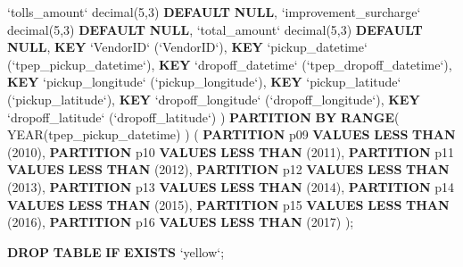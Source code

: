 \documentclass[12pt,twoside]{reedthesis}
\newenvironment{Shaded}{\begin{snugshade}}{\end{snugshade}}
\newcommand{\KeywordTok}[1]{\textcolor[rgb]{0.13,0.29,0.53}{\textbf{#1}}}
\newcommand{\DataTypeTok}[1]{\textcolor[rgb]{0.13,0.29,0.53}{#1}}
\newcommand{\DecValTok}[1]{\textcolor[rgb]{0.00,0.00,0.81}{#1}}
\newcommand{\NormalTok}[1]{#1}
\theoremstyle{definition}
\theoremstyle{definition}
\theoremstyle{definition}
\theoremstyle{remark}
\begin{document}
\begin{Shaded}
\begin{Highlighting}[]
\NormalTok{ `tolls_amount` }\DataTypeTok{decimal}\NormalTok{(}\DecValTok{5}\NormalTok{,}\DecValTok{3}\NormalTok{) }\KeywordTok{DEFAULT} \KeywordTok{NULL}\NormalTok{,}
\NormalTok{ `improvement_surcharge` }\DataTypeTok{decimal}\NormalTok{(}\DecValTok{5}\NormalTok{,}\DecValTok{3}\NormalTok{) }\KeywordTok{DEFAULT} \KeywordTok{NULL}\NormalTok{,}
\NormalTok{ `total_amount` }\DataTypeTok{decimal}\NormalTok{(}\DecValTok{5}\NormalTok{,}\DecValTok{3}\NormalTok{) }\KeywordTok{DEFAULT} \KeywordTok{NULL}\NormalTok{,}
 \KeywordTok{KEY}\NormalTok{ `VendorID` (`VendorID`),}
 \KeywordTok{KEY}\NormalTok{ `pickup_datetime` (`tpep_pickup_datetime`),}
 \KeywordTok{KEY}\NormalTok{ `dropoff_datetime` (`tpep_dropoff_datetime`),}
 \KeywordTok{KEY}\NormalTok{ `pickup_longitude` (`pickup_longitude`),}
 \KeywordTok{KEY}\NormalTok{ `pickup_latitude` (`pickup_latitude`),}
 \KeywordTok{KEY}\NormalTok{ `dropoff_longitude` (`dropoff_longitude`),}
 \KeywordTok{KEY}\NormalTok{ `dropoff_latitude` (`dropoff_latitude`)}
\NormalTok{)}
\KeywordTok{PARTITION} \KeywordTok{BY} \KeywordTok{RANGE}\NormalTok{( }\DataTypeTok{YEAR}\NormalTok{(tpep_pickup_datetime) ) (}
  \KeywordTok{PARTITION}\NormalTok{ p09 }\KeywordTok{VALUES} \KeywordTok{LESS} \KeywordTok{THAN}\NormalTok{ (}\DecValTok{2010}\NormalTok{),}
  \KeywordTok{PARTITION}\NormalTok{ p10 }\KeywordTok{VALUES} \KeywordTok{LESS} \KeywordTok{THAN}\NormalTok{ (}\DecValTok{2011}\NormalTok{),}
  \KeywordTok{PARTITION}\NormalTok{ p11 }\KeywordTok{VALUES} \KeywordTok{LESS} \KeywordTok{THAN}\NormalTok{ (}\DecValTok{2012}\NormalTok{),}
  \KeywordTok{PARTITION}\NormalTok{ p12 }\KeywordTok{VALUES} \KeywordTok{LESS} \KeywordTok{THAN}\NormalTok{ (}\DecValTok{2013}\NormalTok{),}
  \KeywordTok{PARTITION}\NormalTok{ p13 }\KeywordTok{VALUES} \KeywordTok{LESS} \KeywordTok{THAN}\NormalTok{ (}\DecValTok{2014}\NormalTok{),}
  \KeywordTok{PARTITION}\NormalTok{ p14 }\KeywordTok{VALUES} \KeywordTok{LESS} \KeywordTok{THAN}\NormalTok{ (}\DecValTok{2015}\NormalTok{),}
  \KeywordTok{PARTITION}\NormalTok{ p15 }\KeywordTok{VALUES} \KeywordTok{LESS} \KeywordTok{THAN}\NormalTok{ (}\DecValTok{2016}\NormalTok{),}
  \KeywordTok{PARTITION}\NormalTok{ p16 }\KeywordTok{VALUES} \KeywordTok{LESS} \KeywordTok{THAN}\NormalTok{ (}\DecValTok{2017}\NormalTok{)}
\NormalTok{);}

\KeywordTok{DROP} \KeywordTok{TABLE} \KeywordTok{IF} \KeywordTok{EXISTS}\NormalTok{ `yellow`;}


\end{Highlighting}
\end{Shaded}
\end{document}
